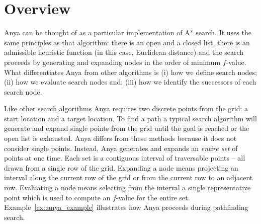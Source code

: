 \newpage
\section{Overview}
\label{sec::overview}
Anya can be thought of as a particular implementation of A{*} search. 
It uses the same principles as that algorithm: there is an open
and a closed list, there is an admissible heuristic function 
(in this case, Euclidean distance) and the search proceeds by generating
and expanding nodes in the order of minimum $f$-value.
What differentiates Anya from other algorithms is (i) how we define 
search nodes; (ii) how we evaluate search nodes and; 
(iii) how we identify the successors of each search node.

Like other search algorithms Anya requires two discrete points from the grid:
a start location and a target location.
To find a path a typical search algorithm will generate and expand single
points from the grid until the goal is reached or the open list is exhausted.
Anya differs from these methods because it does not consider single points.
Instead, Anya generates and expands an \emph{entire set} of points at one time.
Each set is a contiguous interval of traversable points -- all drawn from a 
single row of the grid.
Expanding a node means projecting an interval along the current row
of the grid or from the current row to an adjacent row. Evaluating a node means 
selecting from the interval a single representative point which is used
to compute an $f$-value for the entire set.
Example~\ref{ex::anya_example} illustrates how Anya proceeds during pathfinding search.


